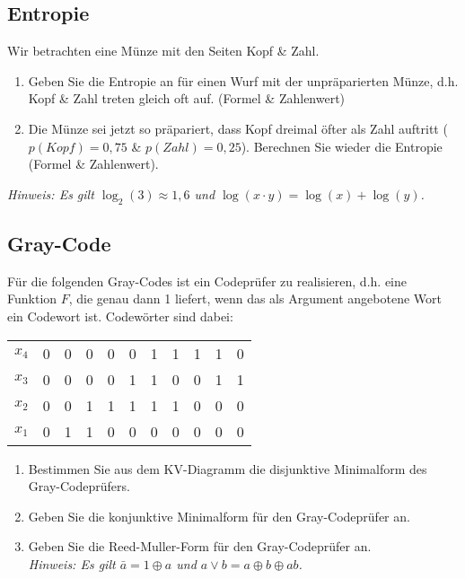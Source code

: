 \documentclass{exercisesheet}
\begin{document}
\subsection{Entropie}
Wir betrachten eine Münze mit den Seiten Kopf \& Zahl.
\begin{enumerate}
  \item Geben Sie die Entropie an für einen Wurf mit der unpräparierten Münze, d.h. Kopf \& Zahl treten gleich oft auf. (Formel \& Zahlenwert)
  \item Die Münze sei jetzt so präpariert, dass Kopf dreimal öfter als Zahl auftritt ($p(Kopf) = 0,75$ \& $p(Zahl) = 0,25$). Berechnen Sie wieder die Entropie (Formel \& Zahlenwert).
\end{enumerate}
\textit{Hinweis: Es gilt $\log_2(3) \approx 1,6$ und $\log(x \cdot y) = \log(x) + \log(y)$.}

\subsection{Gray-Code}
Für die folgenden Gray-Codes ist ein Codeprüfer zu realisieren, d.h. eine Funktion $F$, die genau dann 1 liefert, wenn das als Argument angebotene Wort ein Codewort ist. Codewörter sind dabei:

\begin{center}
  \begin{tabular}{c|cccc cccc cc}
    $x_4$ & 0 & 0 & 0 & 0 & 0 & 1 & 1 & 1 & 1 & 0 \\
    $x_3$ & 0 & 0 & 0 & 0 & 1 & 1 & 0 & 0 & 1 & 1 \\
    $x_2$ & 0 & 0 & 1 & 1 & 1 & 1 & 1 & 0 & 0 & 0 \\
    $x_1$ & 0 & 1 & 1 & 0 & 0 & 0 & 0 & 0 & 0 & 0 \\
  \end{tabular}
\end{center}

\begin{enumerate}
  \item Bestimmen Sie aus dem KV-Diagramm die disjunktive Minimalform des Gray-Codeprüfers.
  \item Geben Sie die konjunktive Minimalform für den Gray-Codeprüfer an.
  \item Geben Sie die Reed-Muller-Form für den Gray-Codeprüfer an.\\\textit{Hinweis: Es gilt $\bar{a}=1\oplus a$ und $a\lor b = a\oplus b\oplus ab$.}
\end{enumerate}

\setcounter{subsection}{9}
\end{document}
